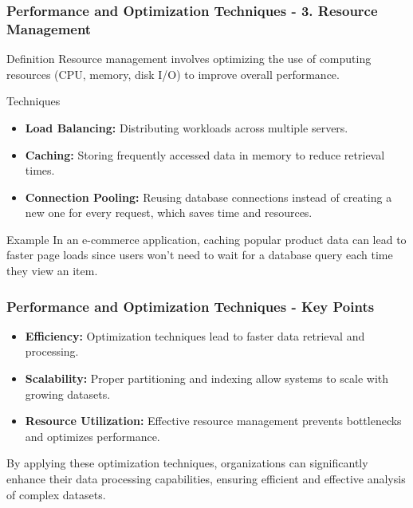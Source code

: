 \documentclass{beamer}
\begin{document}
\begin{frame}[fragile]
    \frametitle{Performance and Optimization Techniques - 3. Resource Management}
    \begin{block}{Definition}
        Resource management involves optimizing the use of computing resources (CPU, memory, disk I/O) to improve overall performance.
    \end{block}
    
    \begin{block}{Techniques}
        \begin{itemize}
            \item \textbf{Load Balancing:} Distributing workloads across multiple servers.
            \item \textbf{Caching:} Storing frequently accessed data in memory to reduce retrieval times.
            \item \textbf{Connection Pooling:} Reusing database connections instead of creating a new one for every request, which saves time and resources.
        \end{itemize}
    \end{block}
    
    \begin{block}{Example}
        In an e-commerce application, caching popular product data can lead to faster page loads since users won’t need to wait for a database query each time they view an item.
    \end{block}
\end{frame}

\begin{frame}[fragile]
    \frametitle{Performance and Optimization Techniques - Key Points}
    \begin{itemize}
        \item \textbf{Efficiency:} Optimization techniques lead to faster data retrieval and processing.
        \item \textbf{Scalability:} Proper partitioning and indexing allow systems to scale with growing datasets.
        \item \textbf{Resource Utilization:} Effective resource management prevents bottlenecks and optimizes performance.
    \end{itemize}
    
    By applying these optimization techniques, organizations can significantly enhance their data processing capabilities, ensuring efficient and effective analysis of complex datasets.
\end{frame}
\end{document}
